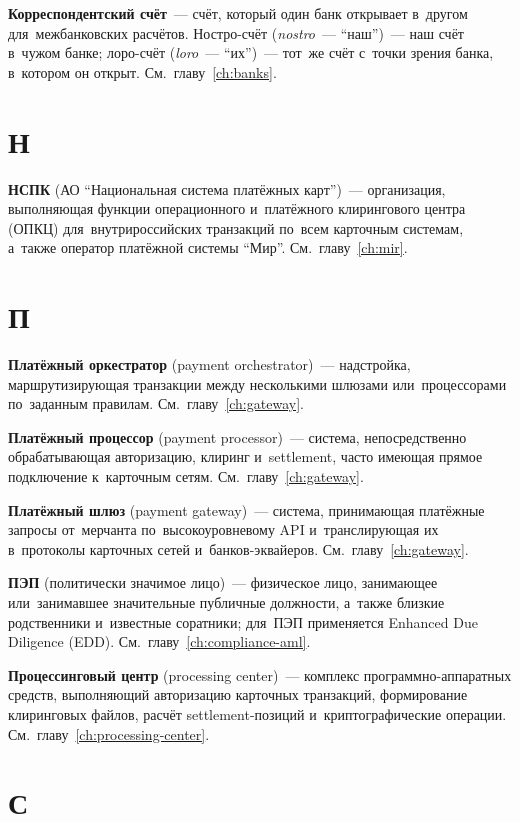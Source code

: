 \textbf{Корреспондентский счёт}~--- счёт, который один банк
открывает в~другом для~межбанковских расчётов. Ностро-счёт
(\emph{nostro}~--- \enquote{наш})~--- наш счёт в~чужом банке;
лоро-счёт (\emph{loro}~--- \enquote{их})~--- тот~же счёт
с~точки зрения банка, в~котором он
открыт. См.~главу~\ref{ch:banks}.


\section*{Н}

\textbf{НСПК} (АО \enquote{Национальная система платёжных
  карт})~--- организация, выполняющая функции операционного
и~платёжного клирингового центра (ОПКЦ) для~внутрироссийских
транзакций по~всем карточным системам, а~также оператор
платёжной системы \enquote{Мир}. См.~главу~\ref{ch:mir}.


\section*{П}

\textbf{Платёжный оркестратор} (payment orchestrator)~---
надстройка, маршрутизирующая транзакции между несколькими
шлюзами или~процессорами по~заданным
правилам. См.~главу~\ref{ch:gateway}.

\textbf{Платёжный процессор} (payment processor)~--- система,
непосредственно обрабатывающая авторизацию, клиринг
и~settlement, часто имеющая прямое подключение к~карточным
сетям. См.~главу~\ref{ch:gateway}.

\textbf{Платёжный шлюз} (payment gateway)~--- система,
принимающая платёжные запросы от~мерчанта по~высокоуровневому
API и~транслирующая их в~протоколы карточных сетей
и~банков-эквайеров. См.~главу~\ref{ch:gateway}.

\textbf{ПЭП} (политически значимое лицо)~--- физическое лицо,
занимающее или~занимавшее значительные публичные должности,
а~также близкие родственники и~известные соратники; для~ПЭП
применяется Enhanced Due Diligence
(EDD). См.~главу~\ref{ch:compliance-aml}.

\textbf{Процессинговый центр} (processing center)~--- комплекс
программно-аппаратных средств, выполняющий авторизацию карточных
транзакций, формирование клиринговых файлов, расчёт
settlement-позиций и~криптографические
операции. См.~главу~\ref{ch:processing-center}.


\section*{С}

